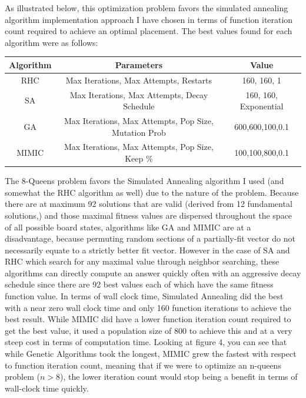 \documentclass[11pt]{article}
\begin{document}
    As illustrated below, this optimization problem favors the simulated annealing algorithm implementation approach I have chosen
    in terms of function iteration count required to achieve an optimal placement.
    The best values found for each algorithm were as follows:
    \begin{center}
        \begin{tabular}{| c | c | c |}
            \hline
            Algorithm & Parameters                                            & Value                 \\
            \hline
            \hline
            RHC       & Max Iterations, Max Attempts, Restarts                & 160, 160, 1           \\
            \hline
            SA        & Max Iterations, Max Attempts, Decay Schedule          & 160, 160, Exponential \\
            \hline
            GA        & Max Iterations, Max Attempts, Pop Size, Mutation Prob & 600,600,100,0.1       \\
            \hline
            MIMIC     & Max Iterations, Max Attempts, Pop Size, Keep \%       & 100,100,800,0.1       \\
            \hline
        \end{tabular}
    \end{center}
    The 8-Queens problem favors the Simulated Annealing algorithm I used (and somewhat the RHC algorithm as well) due to the nature of the problem.
    Because there are at maximum 92 solutions that are valid (derived from 12 fundamental solutions,)\cite{wikipedia_2020} and
    those maximal fitness values are dispersed throughout the space of all possible board states, algorithms like GA and
    MIMIC are at a disadvantage, because permuting random sections of a partially-fit vector do not necessarily equate to a
    strictly better fit vector.
    However in the case of SA and RHC which search for any maximal value through neighbor searching, these algorithms can directly
    compute an answer quickly often with an aggressive decay schedule since there are 92 best values each of which have the
    same fitness function value.
    In terms of wall clock time, Simulated Annealing did the best with a near zero wall clock time and only 160 function iterations to
    achieve the best result.
    While MIMIC did have a lower function iteration count required to get the best value, it used a population size of 800
    to achieve this and at a very steep cost in terms of computation time.
    Looking at figure 4, you can see that while Genetic Algorithms took the longest, MIMIC grew the fastest with respect to function
    iteration count, meaning that if we were to optimize an n-queens problem ($n > 8$), the lower iteration count would stop
    being a benefit in terms of wall-clock time quickly.
\end{document}
